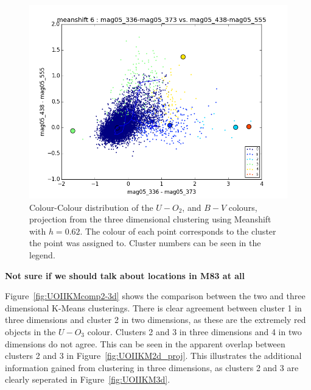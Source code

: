 \begin{figure}
\centering
\includegraphics[width=\linewidth]{figs/successful/meanshift_base_color_6cl_mag05_336-mag05_373vsmag05_438-mag05_555}
\caption{Colour-Colour distribution of the $U-O_{2}$, and $B - V$ colours, projection from the three dimensional clustering using Meanshift with $h=0.62$. The colour of each point corresponds to the cluster the point was assigned to. Cluster numbers can be seen in the legend.}
\label{fig:UOII3dMS6}
\end{figure}

\textbf{Not sure if we should talk about locations in M83 at all}

Figure~\ref{fig:UOIIKMcomp2-3d} shows the comparison between the two and three dimensional K-Means clusterings.
There is clear agreement between cluster 1 in three dimensions and cluster 2 in two dimensions, as these are the extremely red objects in the $U - O_{3}$ colour.
Clusters 2 and 3 in three dimensions and 4 in two dimensions do not agree.
This can be seen in the apparent overlap between clusters 2 and 3 in Figure~\ref{fig:UOIIKM2d_proj}.
This illustrates the additional information gained from clustering in three dimensions, as clusters 2 and 3 are clearly seperated in Figure~\ref{fig:UOIIKM3d}.

